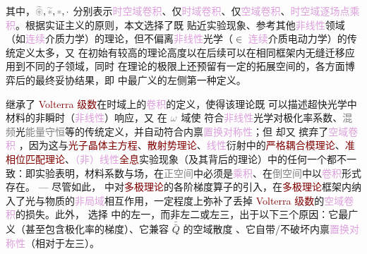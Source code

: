 其中，$\mathcolor{gray}{\widetilde \circledast}, \mathcolor{gray}{\widetilde *}, \mathcolor{gray}{*}, \cdot$ 分别表示\textcolor{Plum}{时空域卷积}、仅\textcolor{Plum}{时域卷积}、仅\textcolor{Plum}{空域卷积}、\textcolor{Plum}{时空域逐场点乘积}。根据\textcolor{NavyBlue}{实证主义}的原则，本文选择了既 {\one} 贴近\textcolor{NavyBlue}{实验现象}、参考其他\textcolor{Plum}{非线性}领域（如\textcolor{Plum}{连续}介质\textcolor{NavyBlue}{力学}）的理论，但不偏离\textcolor{Plum}{非线性}\textcolor{NavyBlue}{光学}（$\in$ \textcolor{Plum}{连续}介质\textcolor{NavyBlue}{电动力学}）的传统定义太多，又 {\two} 在初始有较高的理论高度以在后续可以在相同框架内无缝迁移应用到不同的子领域，同时 {\three} 在理论的极限上还预留有一定的拓展空间的，各方面博弈后的最终妥协结果，即  中最广义的左侧第一种定义。

 继承了 \textcolor{Maroon}{Volterra 级数}在时域上的\textcolor{Plum}{卷积}的定义，使得该理论既 {\one} 可以描述超快光学中材料的\textcolor{NavyBlue}{非瞬时}（\textcolor{Plum}{非线性}）响应，又 {\two} 在 $\mathcolor{gray}{\omega}$ 域使  符合\textcolor{Plum}{非线性}\textcolor{NavyBlue}{光学}对极化率系数、\textcolor{gray}{混频}光\textcolor{gray}{能量守恒}等的传统定义，并自动符合内禀\textcolor{Plum}{置换对称性}；但  却又 {\three} 摈弃了\textcolor{Plum}{空域卷积} ，因为这与\textcolor{Maroon}{光子晶体主方程}\cite{sakodaOpticalPropertiesPhotonic2005,joannopoulosPhotonicCrystalsMolding2008}、\textcolor{Maroon}{散射势理论}\cite{PrinciplesOptics7th,gerkeAperiodicVolumeOptics2010}、\textcolor{Plum}{线性}衍射中的\textcolor{Maroon}{严格耦合模理论}\cite{moharamRigorousCoupledwaveAnalysis1981,ZhuBangTaoGeXiangYiXingZhouQiXingJieGourcwaSuanFaJiBingXingJiSuanJiaSu2016}、\textcolor{Maroon}{准相位匹配理论}\cite{arieQuasiPhaseMatching2007a,zhangUniversalModelingSecondorder2018,chenQuasiphasematchingdivisionMultiplexingHolography2021b,chenLaserNanoprinting3D2023}、\textcolor{Plum}{（非）线性}\textcolor{Maroon}{全息}实验现象（及其背后的理论）\cite{zhangNonlinearPhotonicCrystals2021,chenQuasiphasematchingdivisionMultiplexingHolography2021b,chenLaserNanoprinting3D2023,gerkeAperiodicVolumeOptics2010}中的任何一个都不一致：即实验表明，材料系数与场，在\textcolor{gray}{正空间}中必须是\textcolor{Plum}{乘积}、在\textcolor{gray}{倒空间}中以\textcolor{Plum}{卷积}形式存在。 ---  尽管如此，{\four}  中对\textcolor{Maroon}{多极理论}的各阶梯度算子的引入，在\textcolor{Maroon}{多极理论}框架内纳入了光与物质的\textcolor{Plum}{非局域}相互作用，一定程度上弥补了丢掉 \textcolor{Maroon}{Volterra 级数}的\textcolor{Plum}{空域卷积}的损失。此外，{\five} 选择  中的左一，而非左二或左三，出于以下三个原因：它最广义（甚至包含极化率的梯度）、它兼容 $\bar{\bar{Q}}$ 的空域散度 、它自带/不破坏内禀\textcolor{Plum}{置换对称性}（相对于左三）。


